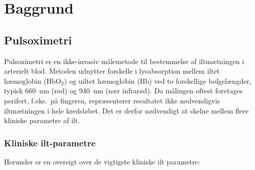 \chapter{Baggrund}

\section{Pulsoximetri}
Pulsoximetri er en ikke-invasiv målemetode til bestemmelse af iltmætningen i arterielt blod. Metoden udnytter forskelle i lysabsorption mellem iltet hæmoglobin ($\text{HbO}_2$) og uiltet hæmoglobin ($\text{Hb}$) ved to forskellige bølgelængder, typisk \SI{660}{nm} (rød) og \SI{940}{nm} (nær infrarød). Da målingen oftest foretages perifert, f.eks.\ på fingeren, repræsenterer resultatet ikke nødvendigvis iltmætningen i hele kredsløbet. Det er derfor nødvendigt at skelne mellem flere kliniske parametre af ilt.

\subsection{Kliniske ilt-parametre}
Herunder er en oversigt over de vigtigste kliniske ilt parametre:


